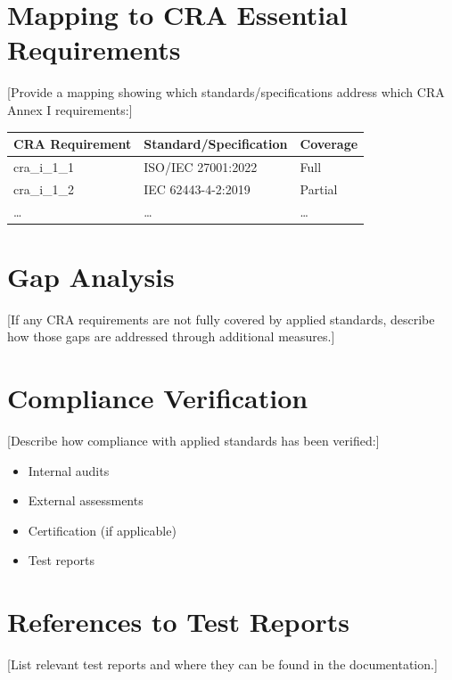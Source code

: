 \documentclass[
  11 pt,
  a4paper,
  table]{report}
\providecommand{\tightlist}{%
  \setlength{\itemsep}{0pt}\setlength{\parskip}{0pt}}\usepackage{longtable,booktabs,array}
\begin{document}
\section{Mapping to CRA Essential
Requirements}\label{mapping-to-cra-essential-requirements}

{[}Provide a mapping showing which standards/specifications address
which CRA Annex I requirements:{]}

\begin{longtable}[]{@{}lll@{}}
\toprule\noalign{}
CRA Requirement & Standard/Specification & Coverage \\
\midrule\noalign{}
\endhead
\bottomrule\noalign{}
\endlastfoot
cra\_i\_1\_1 & ISO/IEC 27001:2022 & Full \\
cra\_i\_1\_2 & IEC 62443-4-2:2019 & Partial \\
\ldots{} & \ldots{} & \ldots{} \\
\end{longtable}

\section{Gap Analysis}\label{gap-analysis}

{[}If any CRA requirements are not fully covered by applied standards,
describe how those gaps are addressed through additional measures.{]}

\section{Compliance Verification}\label{compliance-verification}

{[}Describe how compliance with applied standards has been verified:{]}

\begin{itemize}
\tightlist
\item
  Internal audits
\item
  External assessments
\item
  Certification (if applicable)
\item
  Test reports
\end{itemize}

\section{References to Test Reports}\label{references-to-test-reports}

{[}List relevant test reports and where they can be found in the
documentation.{]}
\end{document}
